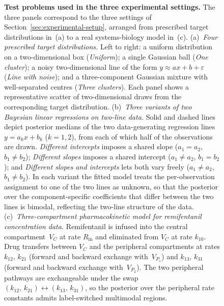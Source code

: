 \begin{figure}[H]
\caption{
\textbf{Test problems used in the three experimental settings.}
The three panels correspond to the three settings of Section~\ref{sec:experimental-setup}, arranged from prescribed target distributions in~(a) to a real systems-biology model in~(c).
%
(a)~\emph{Four prescribed target distributions.} Left to right: a uniform distribution on a two-dimensional box (\emph{Uniform}); a single Gaussian ball (\emph{One cluster}); a noisy two-dimensional line of the form $y \approx a x + b + \varepsilon$ (\emph{Line with noise}); and a three-component Gaussian mixture with well-separated centres (\emph{Three clusters}). Each panel shows a representative scatter of two-dimensional draws from the corresponding target distribution.
%
(b)~\emph{Three variants of two Bayesian linear regressions on two-line data.} Solid and dashed lines depict posterior medians of the two data-generating regression lines $y = a_k x + b_k$ ($k = 1, 2$), from each of which half of the observations are drawn. \emph{Different intercepts} imposes a shared slope ($a_1 = a_2$, $b_1 \neq b_2$); \emph{Different slopes} imposes a shared intercept ($a_1 \neq a_2$, $b_1 = b_2$); and \emph{Different slopes and intercepts} lets both vary freely ($a_1 \neq a_2$, $b_1 \neq b_2$). In each variant the fitted model treats the per-observation assignment to one of the two lines as unknown, so that the posterior over the component-specific coefficients that differ between the two lines is bimodal, reflecting the two-line structure of the data.
%
(c)~\emph{Three-compartment pharmacokinetic model for remifentanil concentration data.} Remifentanil is infused into the central compartment~$V_C$ at rate $R_{\mathrm{in}}$ and eliminated from $V_C$ at rate $k_{10}$. Drug transfers between $V_C$ and the peripheral compartments at rates $k_{12},\,k_{21}$ (forward and backward exchange with~$V_{P_1}$) and $k_{13},\,k_{31}$ (forward and backward exchange with~$V_{P_2}$). The two peripheral pathways are exchangeable under the swap $(k_{12},\,k_{21}) \leftrightarrow (k_{13},\,k_{31})$, so the posterior over the peripheral rate constants admits label-switched multimodal regions.
}
\label{fig:controlled-experiments}
\end{figure}
